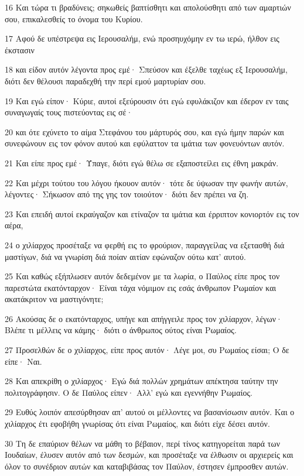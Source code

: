 \par 16 Και τώρα τι βραδύνεις; σηκωθείς βαπτίσθητι και απολούσθητι από των αμαρτιών σου, επικαλεσθείς το όνομα του Κυρίου.
\par 17 Αφού δε υπέστρεψα εις Ιερουσαλήμ, ενώ προσηυχόμην εν τω ιερώ, ήλθον εις έκστασιν
\par 18 και είδον αυτόν λέγοντα προς εμέ· Σπεύσον και έξελθε ταχέως εξ Ιερουσαλήμ, διότι δεν θέλουσι παραδεχθή την περί εμού μαρτυρίαν σου.
\par 19 Και εγώ είπον· Κύριε, αυτοί εξεύρουσιν ότι εγώ εφυλάκιζον και έδερον εν ταις συναγωγαίς τους πιστεύοντας εις σέ·
\par 20 και ότε εχύνετο το αίμα Στεφάνου του μάρτυρός σου, και εγώ ήμην παρών και συνεφώνουν εις τον φόνον αυτού και εφύλαττον τα ιμάτια των φονευόντων αυτόν.
\par 21 Και είπε προς εμέ· Ύπαγε, διότι εγώ θέλω σε εξαποστείλει εις έθνη μακράν.
\par 22 Και μέχρι τούτου του λόγου ήκουον αυτόν· τότε δε ύψωσαν την φωνήν αυτών, λέγοντες· Σήκωσον από της γης τον τοιούτον· διότι δεν πρέπει να ζη.
\par 23 Και επειδή αυτοί εκραύγαζον και ετίναζον τα ιμάτια και έρριπτον κονιορτόν εις τον αέρα,
\par 24 ο χιλίαρχος προσέταξε να φερθή εις το φρούριον, παραγγείλας να εξετασθή διά μαστίγων, διά να γνωρίση διά ποίαν αιτίαν εφώναζον ούτω κατ' αυτού.
\par 25 Και καθώς εξήπλωσεν αυτόν δεδεμένον με τα λωρία, ο Παύλος είπε προς τον παρεστώτα εκατόνταρχον· Είναι τάχα νόμιμον εις εσάς άνθρωπον Ρωμαίον και ακατάκριτον να μαστιγόνητε;
\par 26 Ακούσας δε ο εκατόνταρχος, υπήγε και απήγγειλε προς τον χιλίαρχον, λέγων· Βλέπε τι μέλλεις να κάμης· διότι ο άνθρωπος ούτος είναι Ρωμαίος.
\par 27 Προσελθών δε ο χιλίαρχος, είπε προς αυτόν· Λέγε μοι, συ Ρωμαίος είσαι; Ο δε είπε· Ναι.
\par 28 Και απεκρίθη ο χιλίαρχος· Εγώ διά πολλών χρημάτων απέκτησα ταύτην την πολιτογράφησιν. Ο δε Παύλος είπεν· Αλλ' εγώ και εγεννήθην Ρωμαίος.
\par 29 Ευθύς λοιπόν απεσύρθησαν απ' αυτού οι μέλλοντες να βασανίσωσιν αυτόν. Και ο χιλίαρχος έτι εφοβήθη γνωρίσας ότι είναι Ρωμαίος, και διότι είχε δέσει αυτόν.
\par 30 Τη δε επαύριον θέλων να μάθη το βέβαιον, περί τίνος κατηγορείται παρά των Ιουδαίων, έλυσεν αυτόν από των δεσμών, και προσέταξε να έλθωσιν οι αρχιερείς και όλον το συνέδριον αυτών και καταβιβάσας τον Παύλον, έστησεν έμπροσθεν αυτών.

